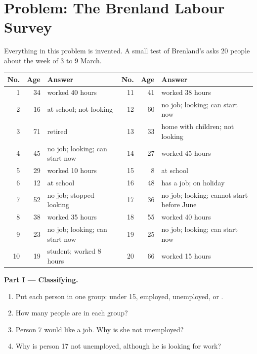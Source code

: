 \section{Problem: The Brenland Labour Survey}

\begin{problem}
\label{pb:g8:jobs-wages-unemployment:1}
Everything in this problem is invented. A small test of Brenland's  asks 20
people about the week of 3 to 9 March.
\begin{center}
\small
\begin{tabular}{rrl@{\hspace{1.5em}}rrl}
\toprule
No. & Age & Answer & No. & Age & Answer \\
\midrule
1 & 34 & worked 40 hours & 11 & 41 & worked 38 hours \\
2 & 16 & at school; not looking & 12 & 60 & no job; looking; can start now \\
3 & 71 & retired & 13 & 33 & home with children; not looking \\
4 & 45 & no job; looking; can start now & 14 & 27 & worked 45 hours \\
5 & 29 & worked 10 hours & 15 & 8 & at school \\
6 & 12 & at school & 16 & 48 & has a job; on holiday \\
7 & 52 & no job; stopped looking & 17 & 36 & no job; looking; cannot start before June \\
8 & 38 & worked 35 hours & 18 & 55 & worked 40 hours \\
9 & 23 & no job; looking; can start now & 19 & 25 & no job; looking; can start now \\
10 & 19 & student; worked 8 hours & 20 & 66 & worked 15 hours \\
\bottomrule
\end{tabular}
\end{center}

\medskip
\noindent\textbf{Part I --- Classifying.}
\begin{enumerate}
  \item Put each person in one group: under 15, employed, unemployed, or .
  \item How many people are in each group?
  \item Person 7 would like a job. Why is she not unemployed?
  \item Why is person 17 not unemployed, although he is looking for work?
\end{enumerate}


\end{problem}
